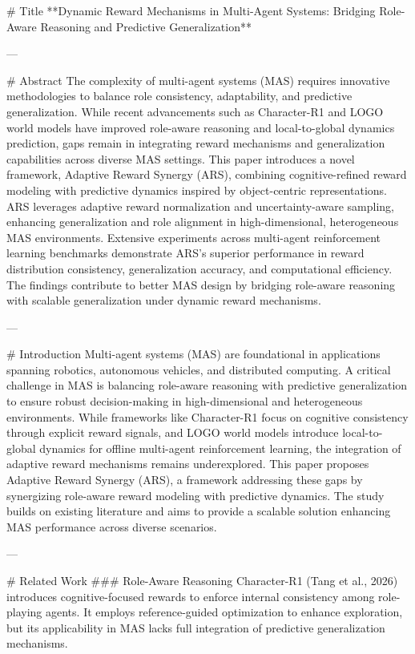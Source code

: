 # Title  
**Dynamic Reward Mechanisms in Multi-Agent Systems: Bridging Role-Aware Reasoning and Predictive Generalization**

---

# Abstract  
The complexity of multi-agent systems (MAS) requires innovative methodologies to balance role consistency, adaptability, and predictive generalization. While recent advancements such as Character-R1 and LOGO world models have improved role-aware reasoning and local-to-global dynamics prediction, gaps remain in integrating reward mechanisms and generalization capabilities across diverse MAS settings. This paper introduces a novel framework, Adaptive Reward Synergy (ARS), combining cognitive-refined reward modeling with predictive dynamics inspired by object-centric representations. ARS leverages adaptive reward normalization and uncertainty-aware sampling, enhancing generalization and role alignment in high-dimensional, heterogeneous MAS environments. Extensive experiments across multi-agent reinforcement learning benchmarks demonstrate ARS's superior performance in reward distribution consistency, generalization accuracy, and computational efficiency. The findings contribute to better MAS design by bridging role-aware reasoning with scalable generalization under dynamic reward mechanisms.

---

# Introduction  
Multi-agent systems (MAS) are foundational in applications spanning robotics, autonomous vehicles, and distributed computing. A critical challenge in MAS is balancing role-aware reasoning with predictive generalization to ensure robust decision-making in high-dimensional and heterogeneous environments. While frameworks like Character-R1 focus on cognitive consistency through explicit reward signals, and LOGO world models introduce local-to-global dynamics for offline multi-agent reinforcement learning, the integration of adaptive reward mechanisms remains underexplored. This paper proposes Adaptive Reward Synergy (ARS), a framework addressing these gaps by synergizing role-aware reward modeling with predictive dynamics. The study builds on existing literature and aims to provide a scalable solution enhancing MAS performance across diverse scenarios.

---

# Related Work  
### Role-Aware Reasoning  
Character-R1 (Tang et al., 2026) introduces cognitive-focused rewards to enforce internal consistency among role-playing agents. It employs reference-guided optimization to enhance exploration, but its applicability in MAS lacks full integration of predictive generalization mechanisms.

